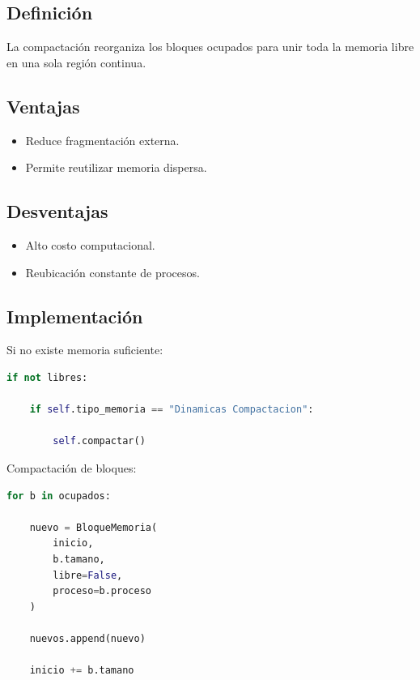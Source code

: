\subsection{Definición}

La compactación reorganiza los bloques ocupados para unir toda la memoria libre en una sola región continua.

\subsection{Ventajas}

\begin{itemize}
    \item Reduce fragmentación externa.
    \item Permite reutilizar memoria dispersa.
\end{itemize}

\subsection{Desventajas}

\begin{itemize}
    \item Alto costo computacional.
    \item Reubicación constante de procesos.
\end{itemize}

\subsection{Implementación}

Si no existe memoria suficiente:

\begin{lstlisting}[language=Python]
if not libres:

    if self.tipo_memoria == "Dinamicas Compactacion":

        self.compactar()
\end{lstlisting}

Compactación de bloques:

\begin{lstlisting}[language=Python]
for b in ocupados:

    nuevo = BloqueMemoria(
        inicio,
        b.tamano,
        libre=False,
        proceso=b.proceso
    )

    nuevos.append(nuevo)

    inicio += b.tamano
\end{lstlisting}

